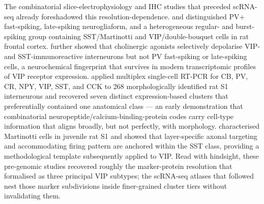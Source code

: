 \documentclass[11pt]{article}
\begin{document}
The combinatorial slice-electrophysiology and IHC studies that preceded scRNA-seq already foreshadowed this resolution-dependence. \citet{Kawaguchi1996} and \citet{Kawaguchi1997a} distinguished PV+ fast-spiking, late-spiking neurogliaform, and a heterogeneous regular- and burst-spiking group containing SST/Martinotti and VIP/double-bouquet cells in rat frontal cortex. \citet{Kawaguchi1997b} further showed that cholinergic agonists selectively depolarise VIP- and SST-immunoreactive interneurons but not PV fast-spiking or late-spiking cells, a neurochemical fingerprint that survives in modern transcriptomic profiles of VIP receptor expression. \citet{Toledorodriguez2005} applied multiplex single-cell RT-PCR for CB, PV, CR, NPY, VIP, SST, and CCK to 268 morphologically identified rat S1 interneurons and recovered seven distinct expression-based clusters that preferentially contained one anatomical class --- an early demonstration that combinatorial neuropeptide/calcium-binding-protein codes carry cell-type information that aligns broadly, but not perfectly, with morphology. \citet{Wang2004b} characterised Martinotti cells in juvenile rat S1 and showed that layer-specific axonal targeting and accommodating firing pattern are anchored within the SST class, providing a methodological template subsequently applied to VIP. Read with hindsight, these pre-genomic studies recovered roughly the marker-protein resolution that \citet{Tremblay2016} formalised as three principal VIP subtypes; the scRNA-seq atlases that followed nest those marker subdivisions inside finer-grained cluster tiers without invalidating them.
\end{document}
